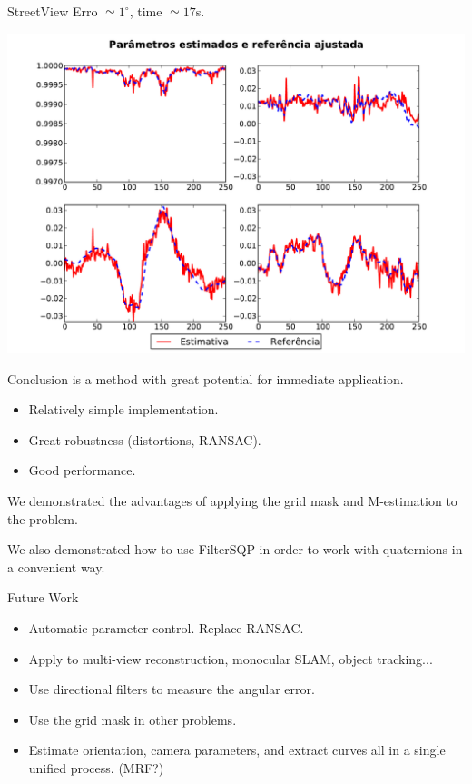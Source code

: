 \begin{frame}{StreetView}
  Erro $\simeq 1^\circ$, time $\simeq 17$s.

\begin{center}
    \includegraphics[height=12\baselineskip]{street_fit.pdf}
  \end{center}
\end{frame}
  

\begin{frame}{Conclusion}
  \corisco is a method with great potential for immediate application.\\
  \begin{itemize}
  \item Relatively simple implementation.
  \item Great robustness (distortions, RANSAC).
  \item Good performance.
  \end{itemize}
  
  We demonstrated the advantages of applying the grid mask and M-estimation to the problem.

  We also demonstrated how to use FilterSQP in order to work with quaternions in a convenient way.
\end{frame}  

\begin{frame}{Future Work}
  \begin{itemize}
  \item Automatic parameter control. Replace RANSAC.
  \item Apply to multi-view reconstruction, monocular SLAM, object tracking...
  \item Use directional filters to measure the angular error.
  \item Use the grid mask in other problems.
  \item Estimate orientation, camera parameters, and extract curves all in a single unified process. (MRF?)
  \end{itemize}
\end{frame}




